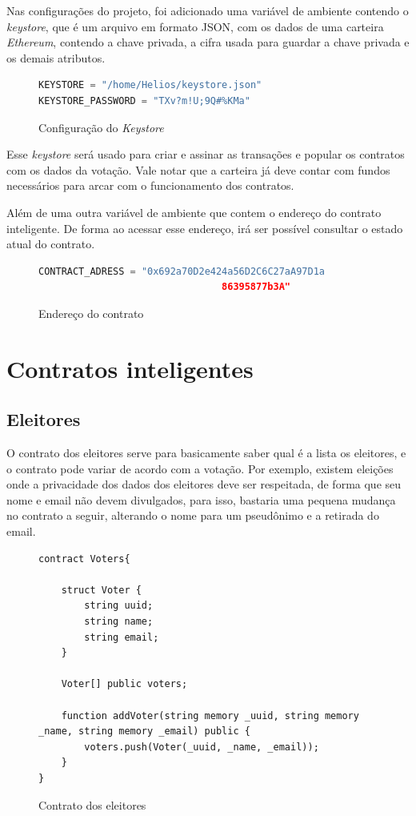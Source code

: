 \documentclass{ufsctex/ufsctex}
\begin{document}
Nas configurações do projeto, foi adicionado uma variável de ambiente contendo
o \textit{keystore}, que é um arquivo em formato JSON, com os dados de uma
carteira \textit{Ethereum}, contendo a chave privada, a cifra usada para
guardar a chave privada e os demais atributos.

\begin{figure}[H]
\centering
\begin{lstlisting}[language=Python, numbers=none]
KEYSTORE = "/home/Helios/keystore.json"
KEYSTORE_PASSWORD = "TXv?m!U;9Q#%KMa"
\end{lstlisting}
	\caption{Configuração do \textit{Keystore}}
\end{figure}

Esse \textit{keystore} será usado para criar e assinar as transações e popular
os contratos com os dados da votação. Vale notar que a carteira já deve contar
com fundos necessários para arcar com o funcionamento dos contratos.

Além de uma outra variável de ambiente que contem o endereço do contrato
inteligente. De forma ao acessar esse endereço, irá ser possível consultar o
estado atual do contrato.

\begin{figure}[H]
\centering
\begin{lstlisting}[language=Python, numbers=none]
	CONTRACT_ADRESS = "0x692a70D2e424a56D2C6C27aA97D1a
								86395877b3A"
\end{lstlisting}
	\caption{Endereço do contrato}
\end{figure}

\section{Contratos inteligentes}

\subsection{Eleitores}

O contrato dos eleitores serve para basicamente saber qual é a lista os
eleitores, e o contrato pode variar de acordo com a votação.  Por exemplo,
existem eleições onde a privacidade dos dados dos eleitores deve ser
respeitada, de forma que seu nome e email não devem divulgados, para isso,
bastaria uma pequena mudança no contrato a seguir, alterando o nome para um
pseudônimo e a retirada do email.

\begin{figure}[H]
\centering
\begin{lstlisting}[language=Solidity]
contract Voters{
    
    struct Voter {
        string uuid;
        string name;
        string email;
    }
    
    Voter[] public voters;
    
    function addVoter(string memory _uuid, string memory _name, string memory _email) public {
        voters.push(Voter(_uuid, _name, _email));
    }
}
\end{lstlisting}
	\caption{Contrato dos eleitores}
\end{figure}
\end{document}
